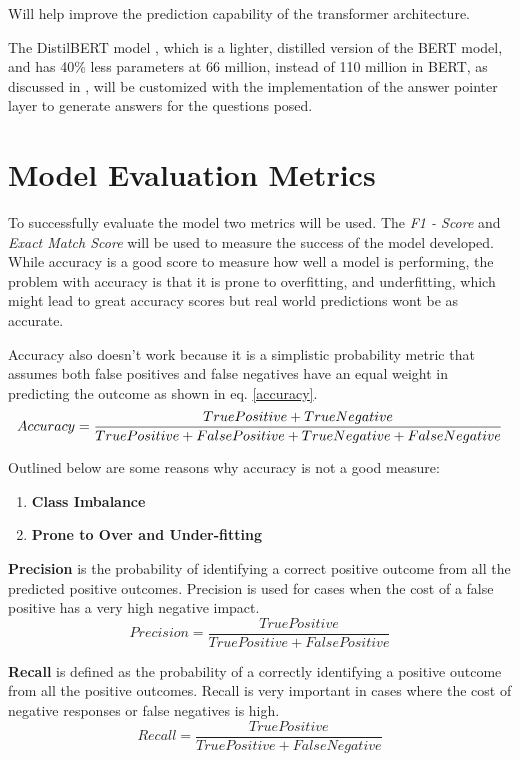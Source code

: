 \documentclass[a4paper,12pt]{report}
\begin{document}
	Will help improve the prediction capability of the transformer architecture.

	The DistilBERT model \citep{distil}, which is a lighter, distilled version of the BERT model, and has 40\% less parameters at 66 million, instead of 110 million in BERT, as discussed in \citep{bert}, will be customized with the implementation of the answer pointer layer to generate answers for the questions posed.


	\section{Model Evaluation Metrics}\label{33}

		To successfully evaluate the model two metrics will be used. The \textit{F1 - Score} and \textit{Exact Match Score} will be used to measure the success of the model developed. While accuracy is a good score to measure how well a model is performing, the problem with accuracy is that it is prone to overfitting, and underfitting, which might lead to great accuracy scores but real world predictions wont be as accurate.

		Accuracy also doesn't work because it is a simplistic probability metric that assumes both false positives and false negatives have an equal weight in predicting the outcome as shown in eq. \ref{accuracy}.
				\begin{equation}\label{accuracy}
			Accuracy = \small \dfrac{True Positive + True Negative}{True Positive + False Positive + True Negative + False Negative}
		\end{equation}

		Outlined below are some reasons why accuracy is not a good measure:
		\begin{enumerate}
			\item \textbf{Class Imbalance}
			\item \textbf{Prone to Over and Under-fitting}
		\end{enumerate}

	\textbf{Precision} is the probability of identifying a correct positive outcome from all the predicted positive outcomes. Precision is used for cases when the cost of a false positive has a very high negative impact.
	\begin{equation}\label{precision}
		Precision = \dfrac{True Positive}{True Positive +  False Positive }
	\end{equation}

	\textbf{Recall} is defined as the probability of a correctly identifying a positive outcome from all the positive outcomes. Recall is very important in cases where the cost of negative responses or false negatives is high.
		\begin{equation}\label{recall}
		Recall = \dfrac{True Positive}{True Positive +  False Negative }
	\end{equation}
\end{document}
